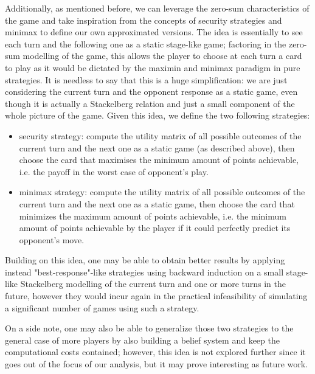 Additionally, as mentioned before, we can leverage the zero-sum characteristics of the game and take inspiration from the concepts of security strategies and minimax to define our own approximated versions.
The idea is essentially to see each turn and the following one as a static stage-like game; factoring in the zero-sum modelling of the game, this allows the player to choose at each turn a card to play as it would be dictated by the maximin and minimax paradigm in pure strategies. It is needless to say that this is a huge simplification: we are just considering the current turn and the opponent response as a static game, even though it is actually a Stackelberg relation and just a small component of the whole picture of the game.
Given this idea, we define the two following strategies:
\begin{itemize}
	\item security strategy: compute the utility matrix of all possible outcomes of the current turn and the next one as a static game (as described above), then choose the card that maximises the minimum amount of points achievable, i.e. the payoff in the worst case of opponent's play.
	\item minimax strategy: compute the utility matrix of all possible outcomes of the current turn and the next one as a static game, then choose the card that minimizes the maximum amount of points achievable, i.e. the minimum amount of points achievable by the player if it could perfectly predict its opponent's move. 
\end{itemize}

Building on this idea, one may be able to obtain better results by applying instead "best-response"-like strategies using backward induction on a small stage-like Stackelberg modelling of the current turn and one or more turns in the future, however they would incur again in the practical infeasibility of simulating a significant number of games using such a strategy. 

On a side note, one may also be able to generalize those two strategies to the general case of more players by also building a belief system and keep the computational costs contained; however, this idea is not explored further since it goes out of the focus of our analysis, but it may prove interesting as future work.